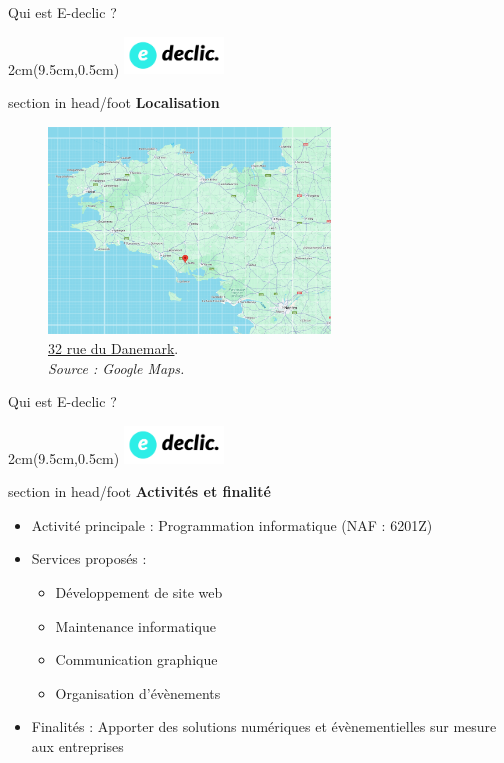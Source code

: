 \documentclass{beamer}
\newcommand{\logoEdeclic}{
	\begin{textblock*}{2cm}(9.5cm,0.5cm)
  		\includegraphics[height=1cm]{../img/logo_e-declic.png}
	\end{textblock*}
}
\begin{document}
\begin{frame}{Qui est E-declic ?}
	\logoEdeclic

	\begin{beamercolorbox}[wd=\paperwidth,ht=1.5em,dp=0.5em,leftskip=0.5cm]{section in head/foot}
  		\large \textbf{Localisation}
	\end{beamercolorbox}
	\vspace{0.5em}
	\begin{center}
  		\begin{minipage}{0.9\textwidth}
			\begin{figure}[t]
  				\includegraphics[height=5.5cm]{../img/localisation.png}
				\caption{				
  					\href{https://maps.app.goo.gl/11j9ZHKrL6TVrdYB6}{\underline{32 rue du Danemark}}.\\
  					\textit{Source : Google Maps.}
				}
  				\label{fig:localisation}
  			\end{figure}
  		\end{minipage}
	\end{center}
	\vfill
\end{frame}

\begin{frame}{Qui est E-declic ?}
	\logoEdeclic

	\begin{beamercolorbox}[wd=\paperwidth,ht=1.5em,dp=0.5em,leftskip=0.5cm]{section in head/foot}
  		\large \textbf{Activités et finalité}
	\end{beamercolorbox}
	\vspace{0.5em}
	\begin{center}
  		\begin{minipage}{0.9\textwidth}
			\begin{itemize}
  				\item Activité principale : Programmation informatique (NAF : 6201Z)
  				\item Services proposés :
  				\begin{itemize}
  					\item Développement de site web
  					\item Maintenance informatique
  					\item Communication graphique
  					\item Organisation d'évènements
  				\end{itemize}
  				\item Finalités : Apporter des solutions numériques et évènementielles sur mesure aux entreprises
  			\end{itemize}
  		\end{minipage}
	\end{center}
	\vfill
\end{frame}
\end{document}
